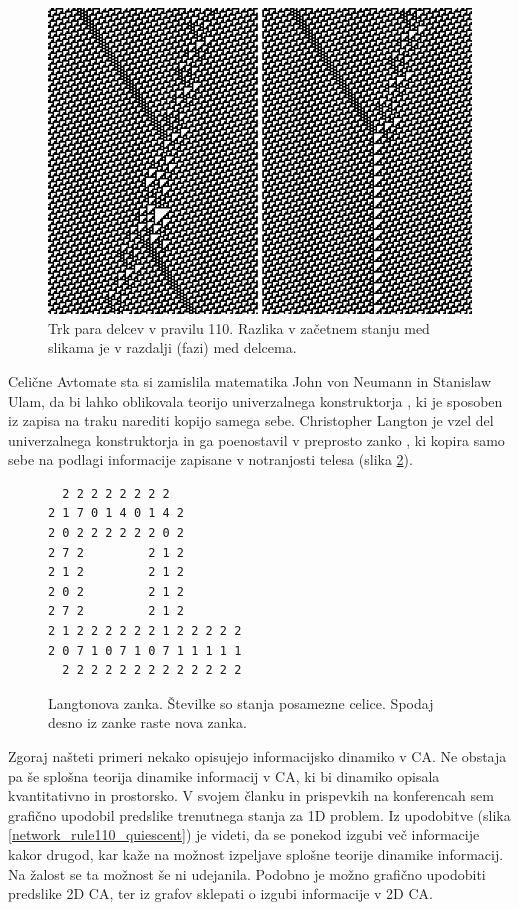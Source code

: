 \documentclass[12pt,a4paper,openany,twoside]{book}
\begin{document}
\begin{figure}[htb]
\centerline{\includegraphics[width=13.9cm]{ca110-interaction2}}
\caption[Trk delcev v pravilu 110.]
{Trk para delcev v pravilu 110. Razlika v začetnem stanju med slikama je v razdalji (fazi) med delcema.}
\label{ca110-interaction2}
\end{figure}

Celične Avtomate sta si zamislila matematika John von Neumann in Stanislaw Ulam,
da bi lahko oblikovala teorijo univerzalnega konstruktorja \cite{WikiVonNeumannUniversalConstructor},
ki je sposoben iz zapisa na traku narediti kopijo samega sebe.
Christopher Langton je vzel del univerzalnega konstruktorja in ga poenostavil v preprosto zanko \cite{WikiLangtonLoops},
ki kopira samo sebe na podlagi informacije zapisane v notranjosti telesa (slika \ref{langtons_loop}).

\begin{figure}[htb]
\centering
\begin{BVerbatim}
  2 2 2 2 2 2 2 2 
2 1 7 0 1 4 0 1 4 2
2 0 2 2 2 2 2 2 0 2
2 7 2         2 1 2
2 1 2         2 1 2
2 0 2         2 1 2
2 7 2         2 1 2
2 1 2 2 2 2 2 2 1 2 2 2 2 2
2 0 7 1 0 7 1 0 7 1 1 1 1 1
  2 2 2 2 2 2 2 2 2 2 2 2 2
\end{BVerbatim}
\caption[Langtonova zanka.]
{Langtonova zanka. Številke so stanja posamezne celice. Spodaj desno iz zanke raste nova zanka.}
\label{langtons_loop}
\end{figure}

Zgoraj našteti primeri nekako opisujejo informacijsko dinamiko v CA.
Ne obstaja pa še splošna teorija dinamike informacij v CA,
ki bi dinamiko opisala kvantitativno in prostorsko.
V svojem članku \cite{JerasDobnikar2007} in prispevkih na konferencah \cite{DBLP:conf/iccS/JerasD06, DBLP:conf/automata/Jeras08, Jeras2008-pyca}
sem grafično upodobil predslike trenutnega stanja za 1D problem.
Iz upodobitve (slika \ref{network_rule110_quiescent}) je videti, da se ponekod izgubi več informacije kakor drugod,
kar kaže na možnost izpeljave splošne teorije dinamike informacij.
Na žalost se ta možnost še ni udejanila. Podobno je možno grafično upodobiti predslike 2D CA,
ter iz grafov sklepati o izgubi informacije v 2D CA.
\end{document}
